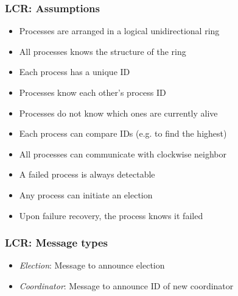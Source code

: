 

\begin{frame}
  \frametitle{LCR: Assumptions}
  \begin{itemize}
  \item Processes are arranged in a logical unidirectional ring
  \item All processes knows the structure of the ring
  \item Each process has a unique ID
  \item Processes know each other's process ID
  \item Processes do not know which ones are currently alive
  \item Each process can compare IDs (e.g. to find the highest)
  \item All processes can communicate with clockwise neighbor
  \item A failed process is always detectable
  \item Any process can initiate an election
  \item Upon failure recovery, the process knows it failed
  \end{itemize}
\end{frame}


\begin{frame}
  \frametitle{LCR: Message types}
  \begin{itemize}
  \item \textit{Election}: Message to announce election
  \item \textit{Coordinator}: Message to announce ID of new coordinator
  \end{itemize}

\end{frame}


